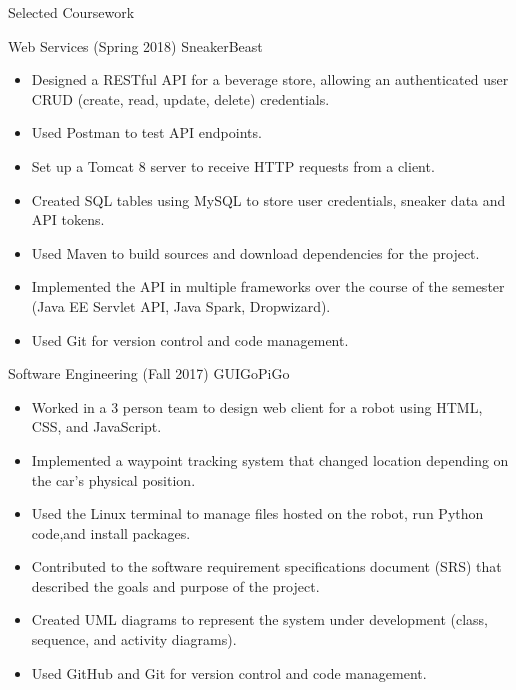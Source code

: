 \documentclass[]{johnsoncv}
\begin{document}
	\begin{cvsection}{Selected Coursework}
		\begin{cvsubsection}{Web Services (Spring 2018)}{}{}
			SneakerBeast
			\begin{itemize}
				\item Designed a RESTful API for a beverage store, allowing an authenticated user CRUD (create, read, update, delete) credentials.
				\item Used Postman to test API endpoints.
				\item Set up a Tomcat 8 server to receive HTTP requests from a client.
				\item Created SQL tables using MySQL to store user credentials, sneaker data and API tokens.
				\item Used Maven to build sources and download dependencies for the project.
				\item Implemented the API in multiple frameworks over the course of the semester (Java EE Servlet API, Java Spark, Dropwizard).
				\item Used Git for version control and code management. 
			\end{itemize}
		\end{cvsubsection}	
		
		\begin{cvsubsection}{Software Engineering (Fall 2017)}{}{}
			GUIGoPiGo
			\begin{itemize}
				\item Worked in a 3 person team to design web client for a robot using HTML, CSS, and JavaScript.
				\item Implemented a waypoint tracking system that changed location depending on the car's physical position.
				\item Used the Linux terminal to manage files hosted on the robot, run Python code,and install packages.
				\item Contributed to the software requirement specifications document (SRS) that described the goals and purpose of the project.
				\item Created UML diagrams to represent the system under development (class, sequence, and activity diagrams).
				\item Used GitHub and Git for version control and code management.
			\end{itemize}
		\end{cvsubsection}


\end{cvsection}
\end{document}
